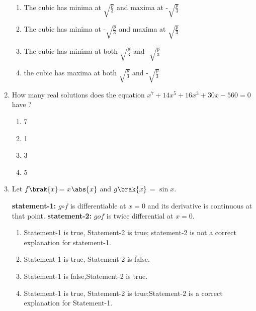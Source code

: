 \documentclass[journal,12pt,onecolumn]{IEEEtran}
\theoremstyle{remark}
\begin{document}
\begin{enumerate}
\begin{enumerate}
        \item The cubic has minima at $\sqrt{\frac{p}{3}}$ and maxima at -$\sqrt{\frac{p}{3}}$
        \item The cubic has minima at -$\sqrt{\frac{p}{3}}$ and maxima at $\sqrt{\frac{p}{3}}$
        \item The cubic has minima at both $\sqrt{\frac{p}{3}}$ and -$\sqrt{\frac{p}{3}}$
        \item the cubic has maxima at both $\sqrt{\frac{p}{3}}$ and -$\sqrt{\frac{p}{3}}$
        
        
        \end{enumerate}
        
            
        \item How many real solutions does the equation $ x^7 + 14x^5 + 16x^3 + 30x- 560 = 0$ have ? \hfill{}
         \begin{multicols}{4}
        \begin{enumerate}
    
            
        
            \item 7
        \item 1
        \item 3
        \item 5
        
        \end{enumerate}
        \end{multicols}
            
        \item Let $f\brak{x}$= $x$$\abs{x}$ and $g\brak{x}$ = $\sin{x}$. 
        
    \textbf{statement-1:}  $g$$\circ$$f$ is differentiable at $x=0$ and its derivative is continuous at that point. 
            \textbf{statement-2:  }$gof$ is twice differential at $x = 0$.  
                 \hfill{} 
                  
        
    
        \begin{enumerate}
        
            
        
            \item Statement-1 is true, Statement-2 is true; statement-2 is not a correct explanation for statement-1.  
            
        \item Statement-1 is true, Statement-2 is false.  
        \item Statement-1 is false,Statement-2 is true.  
        \item Statement-1 is true, Statement-2 is true;Statement-2 is a correct explanation for Statement-1.  


\end{enumerate}
\end{enumerate}
\end{document}
